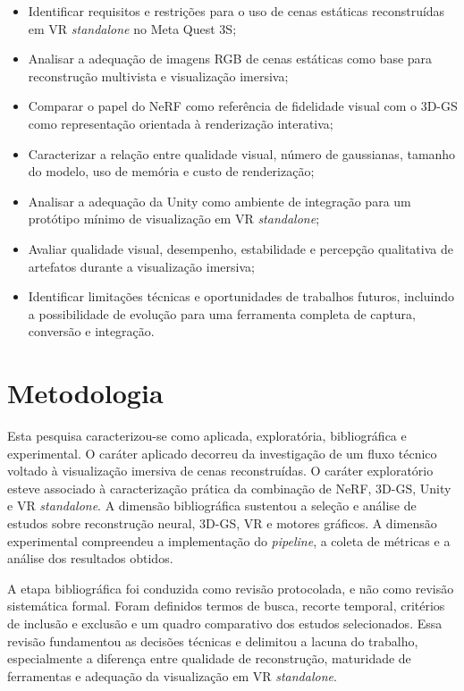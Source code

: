 \begin{itemize}
    \item Identificar requisitos e restrições para o uso de cenas estáticas reconstruídas em VR \textit{standalone} no Meta Quest 3S;
    \item Analisar a adequação de imagens RGB de cenas estáticas como base para reconstrução multivista e visualização imersiva;
    \item Comparar o papel do NeRF como referência de fidelidade visual com o 3D-GS como representação orientada à renderização interativa;
    \item Caracterizar a relação entre qualidade visual, número de gaussianas, tamanho do modelo, uso de memória e custo de renderização;
    \item Analisar a adequação da Unity como ambiente de integração para um protótipo mínimo de visualização em VR \textit{standalone};
    \item Avaliar qualidade visual, desempenho, estabilidade e percepção qualitativa de artefatos durante a visualização imersiva;
    \item Identificar limitações técnicas e oportunidades de trabalhos futuros, incluindo a possibilidade de evolução para uma ferramenta completa de captura, conversão e integração.
\end{itemize}

\section{Metodologia}

Esta pesquisa caracterizou-se como aplicada, exploratória, bibliográfica e experimental. O caráter aplicado decorreu da investigação de um fluxo técnico voltado à visualização imersiva de cenas reconstruídas. O caráter exploratório esteve associado à caracterização prática da combinação de NeRF, 3D-GS, Unity e VR \textit{standalone}. A dimensão bibliográfica sustentou a seleção e análise de estudos sobre reconstrução neural, 3D-GS, VR e motores gráficos. A dimensão experimental compreendeu a implementação do \textit{pipeline}, a coleta de métricas e a análise dos resultados obtidos.

A etapa bibliográfica foi conduzida como revisão protocolada, e não como revisão sistemática formal. Foram definidos termos de busca, recorte temporal, critérios de inclusão e exclusão e um quadro comparativo dos estudos selecionados. Essa revisão fundamentou as decisões técnicas e delimitou a lacuna do trabalho, especialmente a diferença entre qualidade de reconstrução, maturidade de ferramentas e adequação da visualização em VR \textit{standalone}.

